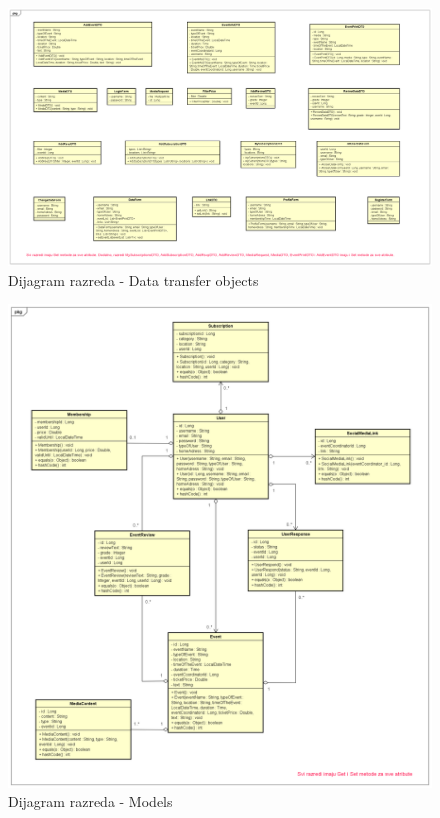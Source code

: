 			
			\begin{figure}[H]
				\includegraphics[width=\textwidth]{dijagrami/cd4.png} 
				\centering
				\vspace{-0.4cm}
				\caption{Dijagram razreda - Data transfer objects}
				\label{cd4}
			\end{figure}
			
		
			
			\newpage
			
			\begin{figure}[H]
				\includegraphics[width=\textwidth]{dijagrami/cd1.png} 
				\centering
				\vspace{-0.5cm}
				\caption{Dijagram razreda - Models}
				\label{cd1}
			\end{figure}
			
